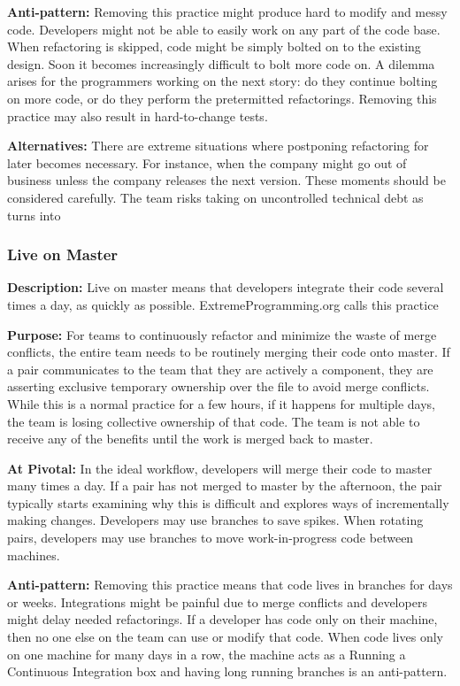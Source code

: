 \textbf{Anti-pattern:} Removing this practice might produce hard to modify and messy code. Developers might not be able to easily work on any part of the code base. When refactoring is skipped, code might be simply bolted on to the existing design. Soon it becomes increasingly difficult to bolt more code on. A dilemma arises for the programmers working on the next story: do they continue bolting on more code, or do they perform the pretermitted refactorings. Removing this practice may also result in hard-to-change tests.

\textbf{Alternatives:} There are extreme situations where postponing refactoring for later becomes necessary. For instance, when the company might go out of business unless the company releases the next version. These moments should be considered carefully. The team risks taking on uncontrolled technical debt as  turns into  

\subsubsection{Live on Master}
\textbf{Description:} Live on master means that developers integrate their code several times a day, as quickly as possible. ExtremeProgramming.org calls this practice  \cite{IntegrateOften} 

\textbf{Purpose:} For teams to continuously refactor and minimize the waste of merge conflicts, the entire team needs to be routinely merging their code onto master.  If a pair communicates to the team that they are actively  a component, they are asserting exclusive temporary ownership over the file to avoid merge conflicts. While this is a normal practice for a few hours, if it happens for multiple days, the team is losing collective ownership of that code. The team is not able to receive any of the benefits until the work is merged back to master. 

\textbf{At Pivotal:} In the ideal workflow, developers will merge their code to master many times a day. If a pair has not merged to master by the afternoon, the pair typically starts examining why this is difficult and explores ways of incrementally making changes. Developers may use branches to save spikes. When rotating pairs, developers may use branches to move work-in-progress code between machines.  

\textbf{Anti-pattern:} Removing this practice means that code lives in branches for days or weeks. Integrations might be painful due to merge conflicts and developers might delay needed refactorings. If a developer has code only on their machine, then no one else on the team can use or modify that code. When code lives only on one machine for many days in a row, the machine acts as a  Running a Continuous Integration box and having long running branches is an anti-pattern.
